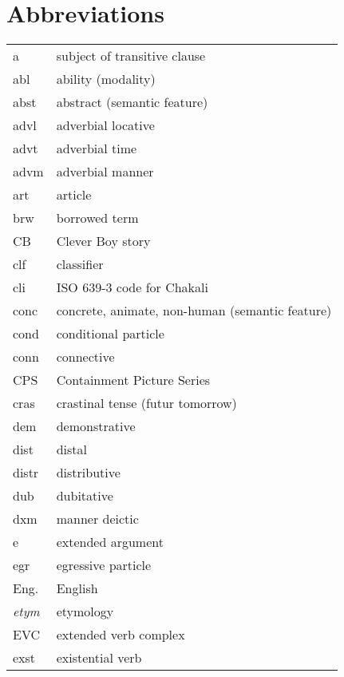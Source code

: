 
\chapter*{Abbreviations}
\label{sec-ABB}



 \begin{xtabular}{ll}


{\sc a} & subject of transitive clause\\
{\sc abl} & ability (modality)\\
 {\sc abst} & abstract (semantic feature)\\
 {\sc advl} & adverbial locative \\
 {\sc advt} & adverbial time \\
{\sc advm}&  adverbial manner\\
{\sc art} &  article\\

brw &  borrowed term\\%

CB  & Clever Boy story\\
{\sc clf} & classifier\\
cli & ISO 639-3 code for Chakali\\
 {\sc conc} & concrete, animate, non-human (semantic feature)\\
 {\sc cond} & conditional particle\\
 {\sc conn} &  connective\\
CPS & Containment Picture Series\\
 {\sc cras} & crastinal tense (futur tomorrow) \\

 {\sc dem} & demonstrative \\
 {\sc dist} & distal \\%
 {\sc distr} & distributive \\
 {\sc dub} & dubitative \\%
{\sc dxm} & manner deictic\\
{\sc e} & extended argument\\
{\sc egr} & egressive particle\\
Eng. & English\\
{\it etym} & etymology\\
EVC & extended verb complex\\
{\sc exst} & existential verb\\



\end{xtabular}
